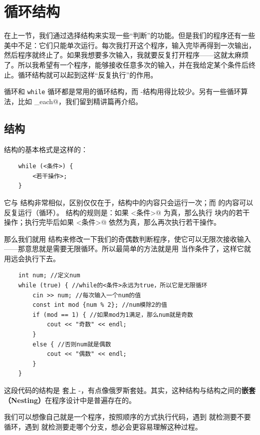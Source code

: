 \section{循环结构}
在上一节，我们通过选择结构来实现一些``判断''的功能。但是我们的程序还有一些美中不足：它们只能单次运行。每次我打开这个程序，输入完毕再得到一次输出，然后程序就终止了。如果我想要多次输入，我就要反复打开程序——这就太麻烦了。所以我希望有一个程序，能够接收任意多次的输入，并在我给定某个条件后终止。循环结构就可以起到这样``反复执行''的作用。\par
\lstinline@for@ 循环和 \lstinline @while@ 循环都是常用的循环结构，而 \lstinline@do@-\lstinline@while@ 结构用得比较少。另有一些循环算法，比如 \lstinline@for_each@，我们留到精讲篇再介绍。\par
\subsection*{\lstinline@while@ 结构}
\lstinline@while@ 结构的基本格式是这样的：
\begin{lstlisting}
    while (<条件>) {
        <若干操作>;
    }
\end{lstlisting}
它与 \lstinline@if@ 结构非常相似，区别仅仅在于，\lstinline@if@ 结构中的内容只会运行一次；而 \lstinline@while@ 的内容可以反复运行（循环）。
\lstinline@while@ 结构的规则是：如果 \lstinline@<条件>@ 为真，那么执行 \lstinline@while@ 块内的若干操作；执行完毕后如果 \lstinline@<条件>@ 依然为真，那么再次执行若干操作。\par
那么我们就用 \lstinline@while@ 结构来修改一下我们的奇偶数判断程序，使它可以无限次接收输入——那意思就是需要无限循环。所以最简单的方法就是用 \lstinline@true@ 当作条件了，这样它就用远会执行下去。
\begin{lstlisting}
    int num; //定义num
    while (true) { //while的<条件>永远为true，所以它是无限循环
        cin >> num; //每次输入一个num的值
        const int mod {num % 2}; //num模除2的值
        if (mod == 1) { //如果mod为1满足，那么num就是奇数
            cout << "奇数" << endl;
        }
        else { //否则num就是偶数
            cout << "偶数" << endl;
        }
    }
\end{lstlisting}
这段代码的结构是 \lstinline@while@ 套上 \lstinline@if@-\lstinline@else@，有点像俄罗斯套娃。其实，这种结构与结构之间的\textbf{嵌套（Nesting）}在程序设计中是普遍存在的。\par
我们可以想像自己就是一个程序，按照顺序的方式执行代码，遇到 \lstinline@while@ 就检测要不要循环，遇到 \lstinline@if@ 就检测要走哪个分支，想必会更容易理解这种过程。\par
